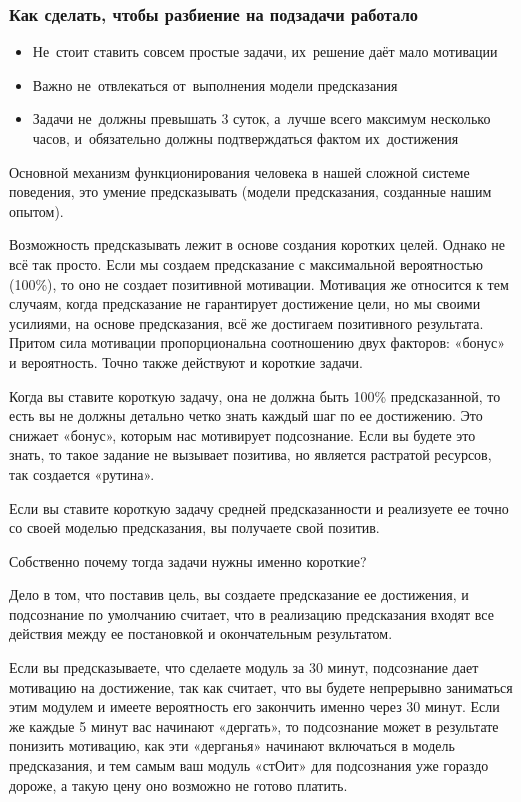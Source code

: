 \documentclass{../industrial-development}
\begin{document}
\begin{frame} \frametitle{Как сделать, чтобы разбиение на подзадачи работало}
  \begin{itemize}
  \item Не~стоит ставить совсем простые задачи, их~решение даёт мало мотивации
  \item Важно не~отвлекаться от~выполнения модели предсказания
  \item Задачи не~должны превышать 3 суток, а~лучше всего максимум несколько часов, и~обязательно должны подтверждаться фактом их~достижения
  \end{itemize}
\end{frame}

\lecturenotes

Основной механизм функционирования человека в нашей сложной системе поведения, это умение предсказывать (модели предсказания, созданные нашим опытом). 

Возможность предсказывать лежит в основе создания коротких целей. Однако не всё так просто.
Если мы создаем предсказание с максимальной вероятностью (100\%), то оно не создает позитивной мотивации.
Мотивация же относится к тем случаям, когда предсказание не гарантирует достижение цели, но мы своими усилиями, на основе предсказания, всё же достигаем позитивного результата. Притом сила мотивации пропорциональна соотношению двух факторов: «бонус» и вероятность.
Точно также действуют и короткие задачи.

Когда вы ставите короткую задачу, она не должна быть 100\% предсказанной, то есть вы не должны детально четко знать каждый шаг по ее достижению. Это снижает «бонус», которым нас мотивирует подсознание. Если вы будете это знать, то такое задание не вызывает позитива, но является растратой ресурсов, так создается «рутина».

Если вы ставите короткую задачу средней предсказанности и реализуете ее точно со своей моделью предсказания, вы получаете свой позитив.

Собственно почему тогда задачи нужны именно короткие?

Дело в том, что поставив цель, вы создаете предсказание ее достижения, и подсознание по умолчанию считает, что в реализацию предсказания входят все действия между ее постановкой и окончательным результатом.

Если вы предсказываете, что сделаете модуль за 30 минут, подсознание дает мотивацию на достижение, так как считает, что вы будете непрерывно заниматься этим модулем и имеете вероятность его закончить именно через 30 минут.
Если же каждые 5 минут вас начинают «дергать», то подсознание может в результате понизить мотивацию, как эти «дерганья» начинают включаться в модель предсказания, и тем самым ваш модуль «стОит» для подсознания уже гораздо дороже, а такую цену оно возможно не готово платить.
\end{document}
